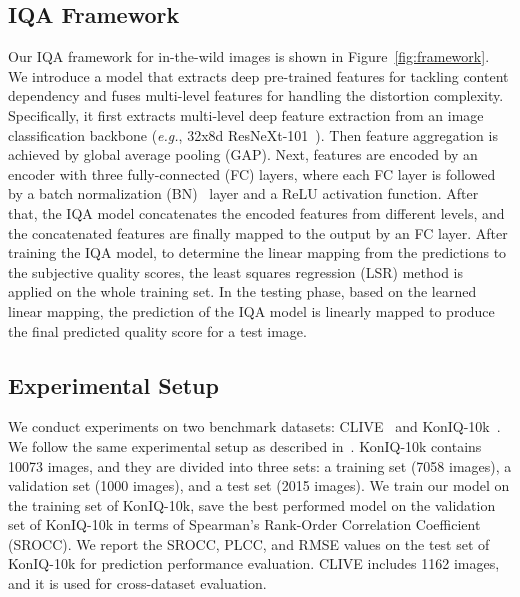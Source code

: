 \documentclass[sigconf]{acmart}
\begin{document}
\subsection{IQA Framework}
\label{sec:framework}

Our IQA framework for in-the-wild images is shown in Figure~\ref{fig:framework}.
We introduce a model that extracts deep pre-trained features for tackling content dependency and fuses multi-level features for handling the distortion complexity. 
Specifically, it first extracts multi-level deep feature extraction from an image classification backbone (\textit{e.g.}, 32x8d ResNeXt-101~\cite{xie2017aggregated}).
Then feature aggregation is achieved by global average pooling (GAP).
Next, features are encoded by an encoder with three fully-connected (FC) layers, where each FC layer is followed by a batch normalization (BN)~\cite{ioffe2015batch} layer and a ReLU activation function. 
After that, the IQA model concatenates the encoded features from different levels, and the concatenated features are finally mapped to the output by an FC layer. 
After training the IQA model, to determine the linear mapping from the predictions to the subjective quality scores, the least squares regression (LSR) method is applied on the whole training set. 
In the testing phase, based on the learned linear mapping, the prediction of the IQA model is linearly mapped to produce the final predicted quality score for a test image.

\subsection{Experimental Setup}
\label{sec:experiments}
We conduct experiments on two benchmark datasets: CLIVE~\cite{ghadiyaram2016massive} and KonIQ-10k~\cite{hosu2019koniq}.
We follow the same experimental setup as described in~\cite{hosu2019koniq}.
KonIQ-10k contains 10073 images, and they are divided into three sets: a training set (7058 images), a validation set (1000 images), and a test set (2015 images).
We train our model on the training set of KonIQ-10k, save the best performed model on the validation set of KonIQ-10k in terms of Spearman's Rank-Order Correlation Coefficient (SROCC).
We report the SROCC, PLCC, and RMSE values on the test set of KonIQ-10k for prediction performance evaluation.
CLIVE includes 1162 images, and it is used for cross-dataset evaluation.
\end{document}
